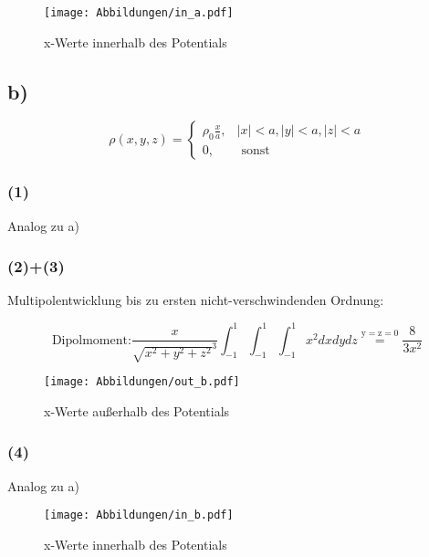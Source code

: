 \begin{figure}[H]
    \centering
    \texttt{[image: Abbildungen/in\_a.pdf]}
    \caption{x-Werte innerhalb des Potentials}
    \label{fig:2a.4}
\end{figure}

\subsection*{b)}

\begin{equation}\rho(x, y, z)=\left\{\begin{array}{ll}
\rho_{0} \frac{x}{a}, & |x|<a,|y|<a,|z|<a \\
0, & \text { sonst }
\end{array}\right.\end{equation}

\subsubsection*{(1)}
Analog zu a)

\subsubsection*{(2)+(3)}
Multipolentwicklung bis zu ersten nicht-verschwindenden Ordnung:

\begin{equation*}
	\text{Dipolmoment:}
  \frac{x}{\sqrt{x^2+y^2+z^2}^3} \int_{-1}^1 \int_{-1}^1 \int_{-1}^1 x^2 dxdydz
  \overset{\mathrm{y=z=0}}{=} \frac{8}{3x^2}
\end{equation*}

\begin{figure}[H]
    \centering
    \texttt{[image: Abbildungen/out\_b.pdf]}
    \caption{x-Werte außerhalb des Potentials}
    \label{fig:2b.2}
\end{figure}

\subsubsection*{(4)}
Analog zu a)

\begin{figure}[H]
    \centering
    \texttt{[image: Abbildungen/in\_b.pdf]}
    \caption{x-Werte innerhalb des Potentials}
    \label{fig:2b.4}
\end{figure}


